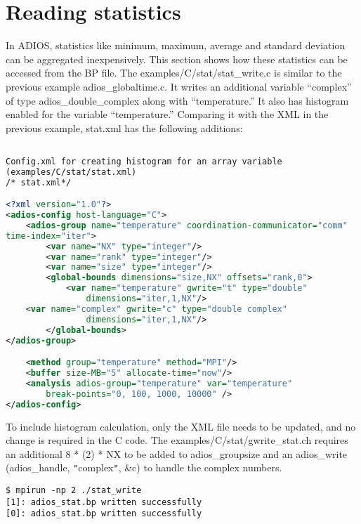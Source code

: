 \section{Reading statistics}

\parindent=0pt
In ADIOS, statistics like minimum, maximum, average and standard deviation can 
be aggregated inexpensively. This section shows how these statistics can be accessed 
from the BP file. The examples/C/stat/stat\_write.c is similar to the previous 
example adios\_globaltime.c. It writes an additional variable ``complex'' of type 
adios\_double\_complex along with ``temperature.''  It also has histogram enabled 
for the variable ``temperature.''  Comparing it with the XML in the previous example, 
stat.xml has the following additions:

\begin{lstlisting}[language=XML,caption=Config.xml for creating histogram for an array variable
(examples/C/stat/stat.xml)]

Config.xml for creating histogram for an array variable
(examples/C/stat/stat.xml)
/* stat.xml*/

<?xml version="1.0"?>
<adios-config host-language="C">
 	<adios-group name="temperature" coordination-communicator="comm" 
time-index="iter">
 		<var name="NX" type="integer"/>
 		<var name="rank" type="integer"/>
 		<var name="size" type="integer"/>
 		<global-bounds dimensions="size,NX" offsets="rank,0">
 			<var name="temperature" gwrite="t" type="double"
 				dimensions="iter,1,NX"/>
 	<var name="complex" gwrite="c" type="double complex"
 				dimensions="iter,1,NX"/>
 		</global-bounds>
</adios-group>

 	<method group="temperature" method="MPI"/>
 	<buffer size-MB="5" allocate-time="now"/>
 	<analysis adios-group="temperature" var="temperature"
 		break-points="0, 100, 1000, 10000" />
</adios-config>
\end{lstlisting}

To include histogram calculation, only the XML file needs to be updated, and no 
change is required in the C code. The examples/C/stat/gwrite\_stat.ch requires 
an additional {\color{color02} 8 * (2) * NX} to be added to adios\_groupsize and 
an adios\_write (adios\_handle, \texttt{"}complex\texttt{"}, \&c) to handle the 
complex numbers.

\begin{lstlisting}
$ mpirun -np 2 ./stat_write
[1]: adios_stat.bp written successfully
[0]: adios_stat.bp written successfully
\end{lstlisting}


